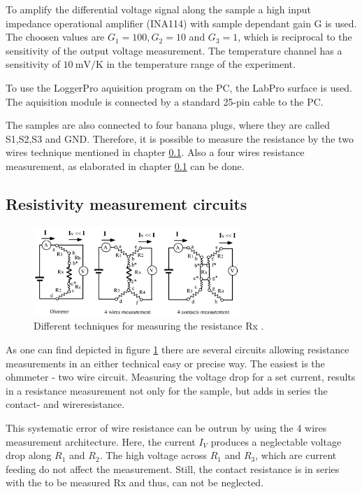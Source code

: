 To amplify the differential voltage signal along the sample a high input impedance operational amplifier (INA114) with sample dependant gain G is used.
The choosen values are $G_1 = 100, G_2=10$ and $G_3=1$, which is reciprocal to the sensitivity of the output voltage measurement.
The temperature channel has a sensitivity of $\SI{10}{\milli\volt\per\kelvin}$ in the temperature range of the experiment.

To use the LoggerPro aquisition program on the PC, the LabPro surface is used. 
The aquisition module is connected by a standard 25-pin cable to the PC.

The samples are also connected to four banana plugs, where they are called S1,S2,S3 and GND.
Therefore, it is possible to measure the resistance by the two wires technique mentioned in chapter \ref{sec:R-measurement}.
Also a four wires resistance measurement, as elaborated in chapter \ref{sec:R-measurement} can be done.

\subsection{Resistivity measurement circuits}
\label{sec:R-measurement}

\begin{figure}
  \centering
  \includegraphics[width=0.7\textwidth]{graphics/r-measure.png}
  \caption[width=0.7\textwidth]{Different techniques for measuring the resistance Rx \cite{instruction}.}
  \label{fig:resistance-measure}
\end{figure}

As one can find depicted in figure \ref{fig:resistance-measure} there are several circuits allowing resistance measurements in an either technical easy or precise way.
The easiest is the ohmmeter - two wire circuit. 
Measuring the voltage drop for a set current, results in a resistance measurement not only for the sample, but adds in series the contact- and wireresistance.
  
This systematic error of wire resistance can be outrun by using the 4 wires measurement architecture.
Here, the current $I_V$ produces a neglectable voltage drop along $R_1$ and $R_2$.
The high voltage across $R_1$ and $R_3$, which are current feeding do not affect the measurement.
Still, the contact resistance is in series with the to be measured Rx and thus, can not be neglected.

